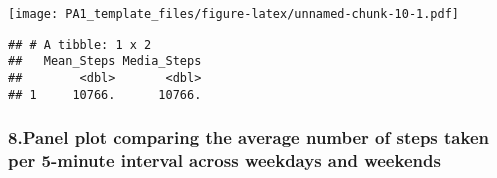 \documentclass[]{article}
\newenvironment{Shaded}{\begin{snugshade}}{\end{snugshade}}
\newcommand{\KeywordTok}[1]{\textcolor[rgb]{0.13,0.29,0.53}{\textbf{#1}}}
\newcommand{\DataTypeTok}[1]{\textcolor[rgb]{0.13,0.29,0.53}{#1}}
\newcommand{\StringTok}[1]{\textcolor[rgb]{0.31,0.60,0.02}{#1}}
\newcommand{\OperatorTok}[1]{\textcolor[rgb]{0.81,0.36,0.00}{\textbf{#1}}}
\newcommand{\NormalTok}[1]{#1}
\begin{document}
\texttt{[image: PA1\_template\_files/figure-latex/unnamed-chunk-10-1.pdf]}

\begin{Shaded}
\end{Shaded}

\begin{verbatim}
## # A tibble: 1 x 2
##   Mean_Steps Media_Steps
##        <dbl>       <dbl>
## 1     10766.      10766.
\end{verbatim}

\subsubsection{8.Panel plot comparing the average number of steps taken
per 5-minute interval across weekdays and
weekends}\label{panel-plot-comparing-the-average-number-of-steps-taken-per-5-minute-interval-across-weekdays-and-weekends}
\end{document}
